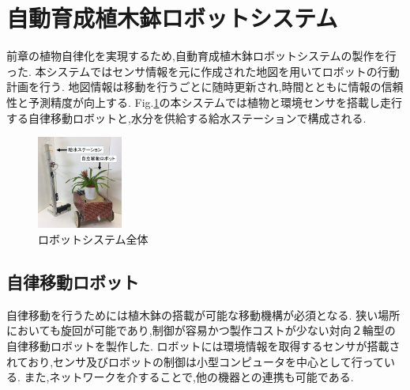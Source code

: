 \documentclass[10pt]{jsarticle}
\begin{document}
\section{自動育成植木鉢ロボットシステム}
前章の植物自律化を実現するため,自動育成植木鉢ロボットシステムの製作を行った.
本システムではセンサ情報を元に作成された地図を用いてロボットの行動計画を行う.
地図情報は移動を行うごとに随時更新され,時間とともに情報の信頼性と予測精度が向上する.
Fig.\ref{robot_all}の本システムでは植物と環境センサを搭載し走行する自律移動ロボットと,水分を供給する給水ステーションで構成される.
\begin{figure}[ht]
    \centering
    \includegraphics[width=0.25\textwidth]{img/IMG_3901a.JPG}
    \caption{ロボットシステム全体}
    \label{robot_all}
\end{figure}
\subsection{自律移動ロボット}
自律移動を行うためには植木鉢の搭載が可能な移動機構が必須となる.
狭い場所においても旋回が可能であり,制御が容易かつ製作コストが少ない対向２輪型の自律移動ロボットを製作した.
ロボットには環境情報を取得するセンサが搭載されており,センサ及びロボットの制御は小型コンピュータを中心として行っている.
また,ネットワークを介することで,他の機器との連携も可能である.
\end{document}
